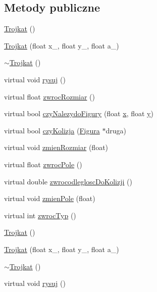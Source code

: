 \subsection*{Metody publiczne}
\begin{DoxyCompactItemize}
\item 
\hyperlink{classTrojkat_a96b62e4eb4b351234c26b9e8b778c633}{Trojkat} ()
\item 
\hyperlink{classTrojkat_a8a80f197328c308d2ae4816a4d1eefca}{Trojkat} (float x\-\_\-, float y\-\_\-, float a\-\_\-)
\item 
\hyperlink{classTrojkat_acb46695e95bf1d277cda20ca2308dc8f}{$\sim$\-Trojkat} ()
\item 
virtual void \hyperlink{classTrojkat_ac61a9a7c73a7d2b26a006f5d0b93b764}{rysuj} ()
\item 
virtual float \hyperlink{classTrojkat_aaa6d596b67627b3bb7c8262503f4009f}{zwroc\-Rozmiar} ()
\item 
virtual bool \hyperlink{classTrojkat_a871b255c6920fa5310baf3a995b58abc}{czy\-Nalezydo\-Figury} (float \hyperlink{classFigura_ad640a05ebb1ddbf595124f0b31793e8a}{x}, float \hyperlink{classFigura_ab17e5953f2898eb729b2dc506640bce2}{y})
\item 
virtual bool \hyperlink{classTrojkat_a87c603d7ff1eb8dc9fde4918f9913d8c}{czy\-Kolizja} (\hyperlink{classFigura}{Figura} $\ast$druga)
\item 
virtual void \hyperlink{classTrojkat_a87aa9e537564fd357b0a0ed201e31bac}{zmien\-Rozmiar} (float)
\item 
virtual float \hyperlink{classTrojkat_a35e916271aeef83d4ec42001cba75ef7}{zwroc\-Pole} ()
\item 
virtual double \hyperlink{classTrojkat_aba9f0a511f9910617302485b5fae0811}{zwrocodleglosc\-Do\-Kolizji} ()
\item 
virtual void \hyperlink{classTrojkat_a2f6bef37c3aa379f95f5cb1e41cf90ce}{zmien\-Pole} (float)
\item 
virtual int \hyperlink{classTrojkat_af09fa611c1c0fd094883e8a0a9c36b4e}{zwroc\-Typ} ()
\item 
\hyperlink{classTrojkat_a96b62e4eb4b351234c26b9e8b778c633}{Trojkat} ()
\item 
\hyperlink{classTrojkat_a8a80f197328c308d2ae4816a4d1eefca}{Trojkat} (float x\-\_\-, float y\-\_\-, float a\-\_\-)
\item 
\hyperlink{classTrojkat_acb46695e95bf1d277cda20ca2308dc8f}{$\sim$\-Trojkat} ()
\item 
virtual void \hyperlink{classTrojkat_a3d2eaab066fd06a41f275acad39acdeb}{rysuj} ()

\end{DoxyCompactItemize}
